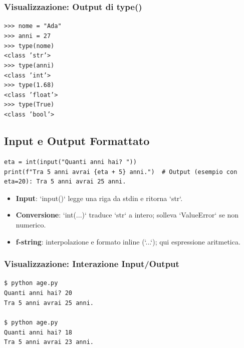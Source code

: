 \subsubsection{Visualizzazione: Output di type()}
\begin{tcolorbox}[title=Terminal Output]
\texttt{>>> nome = "Ada"}\\
\texttt{>>> anni = 27}\\
\texttt{>>> type(nome)}\\
\texttt{<class 'str'>}\\
\texttt{>>> type(anni)}\\
\texttt{<class 'int'>}\\
\texttt{>>> type(1.68)}\\
\texttt{<class 'float'>}\\
\texttt{>>> type(True)}\\
\texttt{<class 'bool'>}
\end{tcolorbox}

\subsection{Input e Output Formattato}
\label{subsec:fond-input-output}
\begin{lstlisting}
eta = int(input("Quanti anni hai? "))
print(f"Tra 5 anni avrai {eta + 5} anni.")  # Output (esempio con eta=20): Tra 5 anni avrai 25 anni.
\end{lstlisting}
\begin{tcolorbox}[title=Spiegazione del codice]
	\begin{itemize}
		\item \textbf{Input}: `input()` legge una riga da stdin e ritorna `str`.
		\item \textbf{Conversione}: `int(...)` traduce `str` a intero; solleva `ValueError` se non numerico.
		\item \textbf{f-string}: interpolazione e formato inline (`{...}`); qui espressione aritmetica.
	\end{itemize}
\end{tcolorbox}

\subsubsection{Visualizzazione: Interazione Input/Output}
\begin{tcolorbox}[title=Terminal Output - Esempio Input]
\texttt{\$ python age.py}\\
\texttt{Quanti anni hai? 20}\\
\texttt{Tra 5 anni avrai 25 anni.}\\
\\
\texttt{\$ python age.py}\\
\texttt{Quanti anni hai? 18}\\
\texttt{Tra 5 anni avrai 23 anni.}
\end{tcolorbox}

